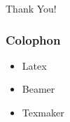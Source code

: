   \begin{frame}
    \begin{center}
    \Huge Thank You!
    \end{center}
  \end{frame}
    
  \begin{frame}
    \frametitle{Colophon}    
    \begin{itemize}
    \item Latex
    \item Beamer
    \item Texmaker
    \end{itemize}    
  \end{frame}
